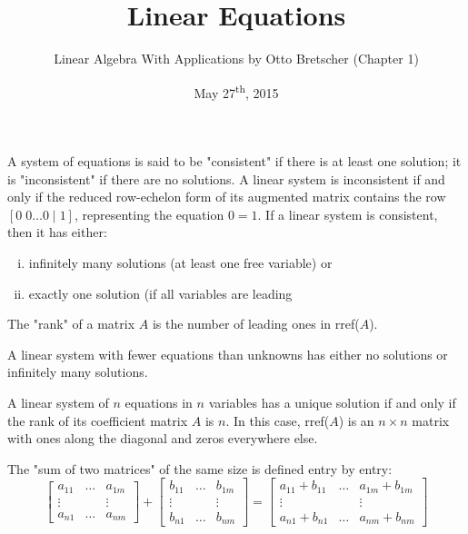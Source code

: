 \documentclass[a4paper,8pt]{article}
\title{Linear Equations}
\author{Linear Algebra With Applications by Otto Bretscher (Chapter 1)}
\date{May 27\textsuperscript{th}, 2015}
\begin{document}
\maketitle
{}

\begin{outline}

    A system of equations is said to be "consistent" if there is at least one solution; it is "inconsistent"
    if there are no solutions. A linear system is inconsistent if and only if the reduced row-echelon form
    of its augmented matrix contains the row \([0\; 0 \ldots 0\; \vert\; 1]\), representing the equation \(0 = 1\).
    If a linear system is consistent, then it has either:
    \begin{enumerate}[i.]
      \item infinitely many solutions (at least one free variable) or
      \item exactly one solution (if all variables are leading
    \end{enumerate}

    The "rank" of a matrix \(A\) is the number of leading ones in rref(\(A\)).

    A linear system with fewer equations than unknowns has either no solutions or infinitely many solutions.

    A linear system of \(n\) equations in \(n\) variables has a unique solution if and only if the rank of its
    coefficient matrix \(A\) is \(n\). In this case, rref(\(A\)) is an \(n \times n\) matrix with ones along the
    diagonal and zeros everywhere else.

    The "sum of two matrices" of the same size is defined entry by entry:
    \[
      \begin{bmatrix} a_{11} & \ldots & a_{1m} \\ \vdots & & \vdots \\ a_{n1} & \ldots & a_{nm} \end{bmatrix} +
      \begin{bmatrix} b_{11} & \ldots & b_{1m} \\ \vdots & & \vdots \\ b_{n1} & \ldots & b_{nm} \end{bmatrix} =
      \begin{bmatrix}
        a_{11} + b_{11} & \ldots & a_{1m} + b_{1m} \\
        \vdots          &        & \vdots          \\
        a_{n1} + b_{n1} & \ldots & a_{nm} + b_{nm}
      \end{bmatrix}
    \]


\end{outline}
\end{document}
